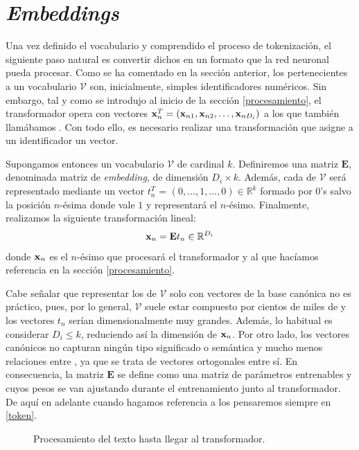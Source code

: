 
\section{\textit{Embeddings}}

Una vez definido el vocabulario y comprendido el proceso de tokenización, el siguiente paso natural es convertir dichos \tokens{} en un formato que la red neuronal pueda procesar. Como se ha comentado en la sección anterior, los \tokens{} pertenecientes a un vocabulario $\mathcal{V}$ son, inicialmente, simples identificadores numéricos. Sin embargo, tal y como se introdujo al inicio de la sección \ref{procesamiento}, el transformador opera con vectores
$\mathbf{x}_n^T = ( \mathbf{x}_{n1}, \mathbf{x}_{n2}, \dots,\mathbf{x}_{nD_i})$
a los que también llamábamos \tokens{}. Con todo ello, es necesario realizar una transformación que asigne a  un identificador un vector.

Supongamos entonces un vocabulario $\mathcal{V}$ de cardinal $k$. 
Definiremos una matriz $\textbf{E}$, denominada matriz de \textit{embedding}, 
de dimensión $D_i \times k$. 
Además, cada \token{} de $\mathcal{V}$ será representado mediante un 
vector $t_n^T$ =  $(0, \dots,1, \dots,0) \in \mathbb{R}^k$ formado por $0$'s salvo 
la posición $n$-ésima donde vale $1$ y  representará el \token{} $n$-ésimo. 
Finalmente, realizamos la siguiente transformación lineal:
\begin{equation}
    \mathbf{x}_n = \textbf{E} t_n \in \mathbb{R}^{D_i}
    \label{token}
\end{equation}
donde $\mathbf{x}_n$ es el \token{}  $n$-ésimo que procesará el transformador y al que 
hacíamos referencia en la sección \ref{procesamiento}.

Cabe señalar que representar los \tokens{} de $\mathcal{V}$ solo con vectores de la 
base canónica no es práctico, pues, por lo general, $\mathcal{V}$  suele estar 
compuesto por cientos de miles de \tokens{} y los vectores $t_n$ serían 
dimensionalmente muy grandes. Además, lo habitual es considerar $D_i \leq k$, 
reduciendo así la dimensión de $\mathbf{x}_n$. Por otro lado, los vectores canónicos no 
capturan ningún tipo significado o semántica y mucho menos relaciones entre \tokens{}, 
ya que se trata de vectores ortogonales entre sí. En consecuencia, 
la matriz $\mathbf{E}$ se define como una matriz de parámetros entrenables y cuyos 
pesos se van ajustando durante el entrenamiento junto al transformador. 
De aquí en adelante cuando hagamos referencia a los \tokens{} pensaremos siempre 
en  \eqref{token}.
\begin{figure}[t]
    \centering
    \embeddingflujo
    \caption{Procesamiento del texto hasta llegar al transformador.}
    \label{fig:embeddingflujo}
\end{figure}

